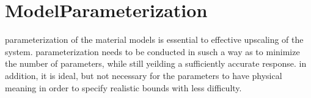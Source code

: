 \section{ModelParameterization}
parameterization of the material models is essential to effective upscaling of the system. parameterization needs to be conducted in susch a way as to minimize the number of parameters, while still yeilding a sufficiently accurate response. in addition, it is ideal, but not necessary for the parameters to have physical meaning in order to specify realistic bounds with less difficulty.